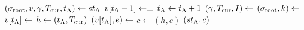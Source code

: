 \algrenewcommand\textproc{}
\algrenewcommand{}

\begin{minipage}{1\linewidth}
  {\fontsize{8}{10}\selectfont

  \begin{algorithmic}[1]
    \State $(\sigma_\text{root},v,\gamma,T_\text{cur},t_\text{A}) \gets st_\text{A}$
    \State $v[t_\text{A}-1] \gets \perp$
    \State $t_\text{A} \gets t_\text{A}+1$
    \State $(\gamma,T_\text{cur},I) \gets$ 
    \State $(\sigma_\text{root},k) \gets$ 
    \State $v[t_\text{A}] \gets$ 
    \EndIf
    \State $h \gets (t_\text{A},T_\text{cur})$
    \State $(v[t_\text{A}],e) \gets$ 
    \State $c \gets (h,e)$
    \State \Return $(st_\text{A},c)$
    \EndProcedure
  \end{algorithmic}
  }
\end{minipage}
